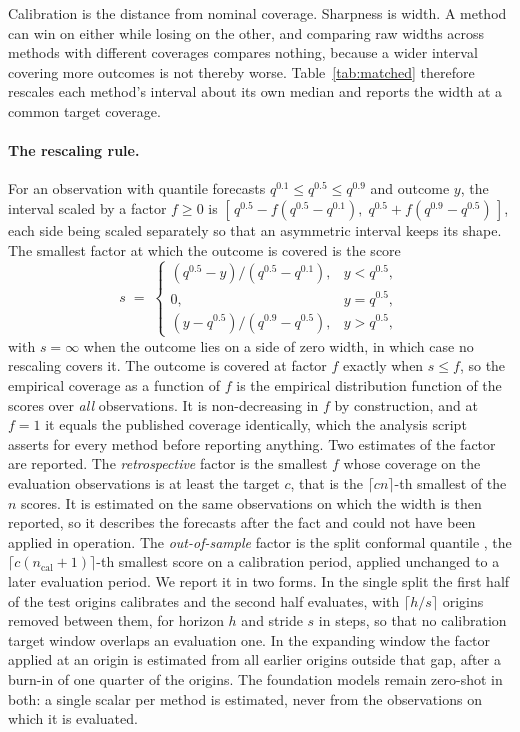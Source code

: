 \documentclass[utf8]{FrontiersinHarvard}
\newif\ifrevisionmarkup
\newcommand{\new}[1]{\ifrevisionmarkup\textcolor{revision}{#1}\else#1\fi}
\newif\ifsecondrevisionmarkup
\newcommand{\rev}[1]{\ifsecondrevisionmarkup\textcolor{revisiontwo}{#1}\else#1\fi}
\theoremstyle{plain}
\theoremstyle{definition}
\theoremstyle{remark}
\begin{document}
\new{ Calibration is the distance from nominal coverage. Sharpness is width. A method can win on either while losing on the other, and comparing raw widths across methods with different coverages compares nothing, because a wider interval covering more outcomes is not thereby worse. Table~\ref{tab:matched} therefore rescales each method's interval about its own median \rev{and reports the width at a common target coverage.}}

\rev{\paragraph{The rescaling rule.} For an observation with quantile forecasts $q^{0.1} \le q^{0.5} \le q^{0.9}$ and outcome $y$, the interval scaled by a factor $f \ge 0$ is $[\,q^{0.5} - f(q^{0.5}-q^{0.1}),\; q^{0.5} + f(q^{0.9}-q^{0.5})\,]$, each side being scaled separately so that an asymmetric interval keeps its shape. The smallest factor at which the outcome is covered is the score
\begin{equation}
s \;=\; \begin{cases} (q^{0.5}-y)/(q^{0.5}-q^{0.1}), & y < q^{0.5},\\[2pt] 0, & y = q^{0.5},\\[2pt] (y-q^{0.5})/(q^{0.9}-q^{0.5}), & y > q^{0.5},\end{cases}
\label{eq:score}
\end{equation}
with $s=\infty$ when the outcome lies on a side of zero width, in which case no rescaling covers it. The outcome is covered at factor $f$ exactly when $s \le f$, so the empirical coverage as a function of $f$ is the empirical distribution function of the scores over \emph{all} observations. It is non-decreasing in $f$ by construction, and at $f=1$ it equals the published coverage identically, which the analysis script asserts for every method before reporting anything. Two estimates of the factor are reported. The \emph{retrospective} factor is the smallest $f$ whose coverage on the evaluation observations is at least the target $c$, that is the $\lceil cn\rceil$-th smallest of the $n$ scores. It is estimated on the same observations on which the width is then reported, so it describes the forecasts after the fact and could not have been applied in operation. The \emph{out-of-sample} factor is the split conformal quantile \citep{vovk2005}, the $\lceil c(n_{\mathrm{cal}}+1)\rceil$-th smallest score on a calibration period, applied unchanged to a later evaluation period. We report it in two forms. In the single split the first half of the test origins calibrates and the second half evaluates, with $\lceil h/s\rceil$ origins removed between them, for horizon $h$ and stride $s$ in steps, so that no calibration target window overlaps an evaluation one. In the expanding window the factor applied at an origin is estimated from all earlier origins outside that gap, after a burn-in of one quarter of the origins. The foundation models remain zero-shot in both: a single scalar per method is estimated, never from the observations on which it is evaluated.}
\end{document}
